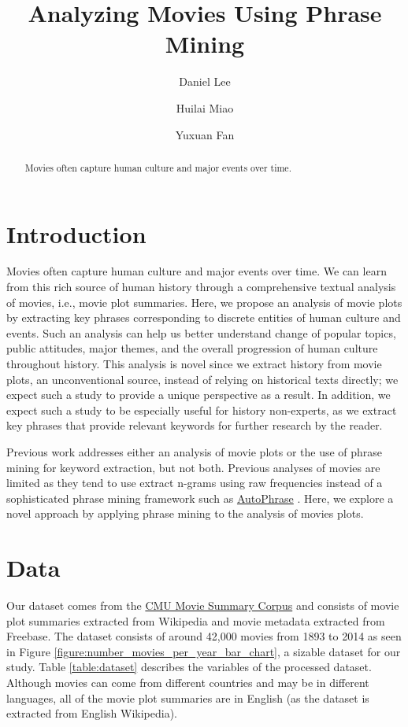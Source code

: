\documentclass[hidelinks]{article}
\title{Analyzing Movies Using Phrase Mining}
\author{Daniel Lee \and Huilai Miao \and Yuxuan Fan}
\begin{document}
\maketitle

\begin{abstract}
Movies often capture human culture and major events over time.
\end{abstract}

\begin{multicols}{2}
\section{Introduction}
Movies often capture human culture and major events over time. We can learn from this rich source of human history through a comprehensive textual analysis of movies, i.e., movie plot summaries. Here, we propose an analysis of movie plots by extracting key phrases corresponding to discrete entities of human culture and events. Such an analysis can help us better understand change of popular topics, public attitudes, major themes, and the overall progression of human culture throughout history. This analysis is novel since we extract history from movie plots, an unconventional source, instead of relying on historical texts directly; we expect such a study to provide a unique perspective as a result. In addition, we expect such a study to be especially useful for history non-experts, as we extract key phrases that provide relevant keywords for further research by the reader.

Previous work addresses either an analysis of movie plots or the use of phrase mining for keyword extraction, but not both. Previous analyses of movies are limited as they tend to use extract n-grams using raw frequencies instead of a sophisticated phrase mining framework such as \href{https://github.com/shangjingbo1226/AutoPhrase}{AutoPhrase} \cite{DBLP:journals/corr/ShangLJRVH17}. Here, we explore a novel approach by applying phrase mining to the analysis of movies plots.

\section{Data}
Our dataset comes from the \href{http://www.cs.cmu.edu/~ark/personas/}{CMU Movie Summary Corpus} \cite{Bamman2013LearningLP} and consists of movie plot summaries extracted from Wikipedia and movie metadata extracted from Freebase. The dataset consists of around 42,000 movies from 1893 to 2014 as seen in Figure \ref{figure:number_movies_per_year_bar_chart}, a sizable dataset for our study. Table \ref{table:dataset} describes the variables of the processed dataset. Although movies can come from different countries and may be in different languages, all of the movie plot summaries are in English (as the dataset is extracted from English Wikipedia).


\end{multicols}
\end{document}
